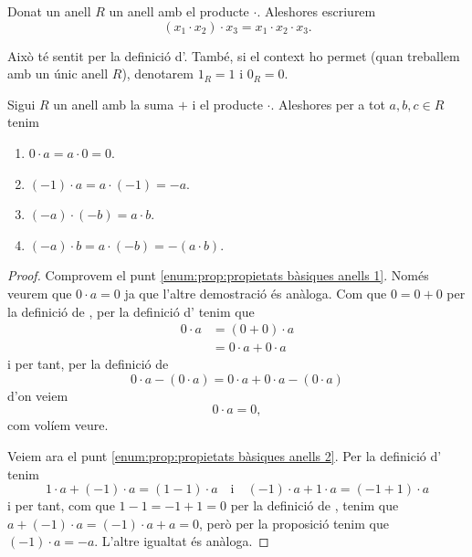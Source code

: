 \documentclass[../../Main.tex]{subfiles}
\begin{document}
	\begin{notation}
		Donat un anell \(R\) un anell amb el producte \(\cdot\). Aleshores escriurem
		\[(x_{1}\cdot x_{2})\cdot x_{3}=x_{1}\cdot x_{2}\cdot x_{3}.\]
		
		Això té sentit per la definició d'. També, si el context ho permet (quan treballem amb un únic anell \(R\)), denotarem \(1_{R}=1\) i \(0_{R}=0\).
	\end{notation}
	\begin{proposition}
		\label{prop:propietats bàsiques anells}
		Sigui \(R\) un anell amb la suma \(+\) i el producte \(\cdot\). Aleshores per a tot \(a,b,c\in R\) tenim
		\begin{enumerate}
			\item\label{enum:prop:propietats bàsiques anells 1} \(0\cdot a=a\cdot0=0\).
			\item\label{enum:prop:propietats bàsiques anells 2} \((-1)\cdot a=a\cdot(-1)=-a\).
			\item\label{enum:prop:propietats bàsiques anells 3} \((-a)\cdot(-b)=a\cdot b\).
			\item\label{enum:prop:propietats bàsiques anells 4} \((-a)\cdot b=a\cdot(-b)=-(a\cdot b)\).
		\end{enumerate}
		\begin{proof}
			Comprovem el punt \eqref{enum:prop:propietats bàsiques anells 1}. Només veurem que \(0\cdot a=0\) ja que l'altre demostració és anàloga. Com que \(0=0+0\) per la definició de , per la definició d' tenim que
			\begin{align*}
			0\cdot a&=(0+0)\cdot a\\
			&=0\cdot a+0\cdot a
			\end{align*}
			i per tant, per la definició de 
			\[0\cdot a-(0\cdot a)=0\cdot a+0\cdot a-(0\cdot a)\]
			d'on veiem
			\[0\cdot a=0,\]
			com volíem veure.
			
			Veiem ara el punt \eqref{enum:prop:propietats bàsiques anells 2}. Per la definició d' tenim
			\[1\cdot a+(-1)\cdot a=(1-1)\cdot a\quad\text{i}\quad(-1)\cdot a+1\cdot a=(-1+1)\cdot a\]
			i per tant, com que \(1-1=-1+1=0\) per la definició de , tenim que \(a+(-1)\cdot a=(-1)\cdot a+a=0\), però per la proposició  tenim que \((-1)\cdot a=-a\). L'altre igualtat és anàloga.
			

\end{proof}
\end{proposition}
\end{document}
